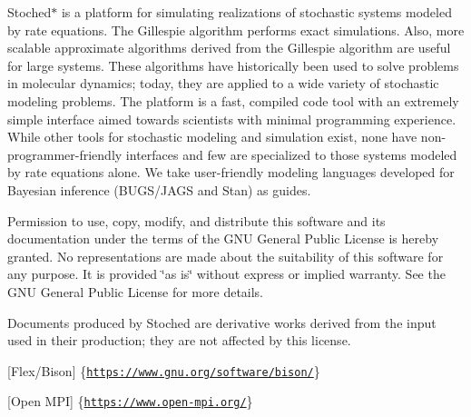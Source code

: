 Stoched$\ast$ is a platform for simulating realizations of stochastic systems modeled by rate equations. The Gillespie algorithm performs exact simulations. Also, more scalable approximate algorithms derived from the Gillespie algorithm are useful for large systems. These algorithms have historically been used to solve problems in molecular dynamics; today, they are applied to a wide variety of stochastic modeling problems. The platform is a fast, compiled code tool with an extremely simple interface aimed towards scientists with minimal programming experience. While other tools for stochastic modeling and simulation exist, none have non-\/programmer-\/friendly interfaces and few are specialized to those systems modeled by rate equations alone. We take user-\/friendly modeling languages developed for Bayesian inference (B\+U\+G\+S/\+J\+A\+GS and Stan) as guides.

Permission to use, copy, modify, and distribute this software and its documentation under the terms of the G\+NU General Public License is hereby granted. No representations are made about the suitability of this software for any purpose. It is provided \char`\"{}as is\char`\"{} without express or implied warranty. See the G\+NU General Public License for more details.

Documents produced by Stoched are derivative works derived from the input used in their production; they are not affected by this license.

\mbox{[}Flex/\+Bison\mbox{]} \{\href{https://www.gnu.org/software/bison/}{\tt https\+://www.\+gnu.\+org/software/bison/}\}

\mbox{[}Open M\+PI\mbox{]} \{\href{https://www.open-mpi.org/}{\tt https\+://www.\+open-\/mpi.\+org/}\} 